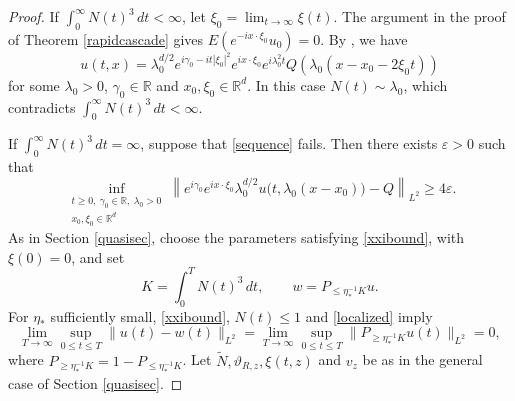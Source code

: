 \documentclass[reqno,11pt]{amsart}
\newcommand{\eps}{{\varepsilon}}
\theoremstyle{plain}
\theoremstyle{definition}
\numberwithin{equation}{section}
\numberwithin{theorem}{section}
\def\geq{\geqslant}
\def\leq{\leqslant}
\def\R{\mathbb{R}}
\def\eps{\varepsilon}
\begin{document}
\begin{proof}
If $\int_0^\infty N(t)^3\,dt<\infty$, let
$\xi_0=\lim_{t\to\infty}\xi(t)$. The argument in the proof of
Theorem \ref{rapidcascade} gives $E(e^{-ix\cdot\xi_0}u_0)=0$.
By \cite[Proposition 3.2]{MiaoXuZhaoblowup}, we have
\[
 u(t,x)=\lambda_0^{d/2}e^{i\gamma_0-it|\xi_0|^2}e^{ix\cdot\xi_0}
       e^{i\lambda_0^2t}Q(\lambda_0(x-x_0-2\xi_0t))
\]
for some $\lambda_0>0$, $\gamma_0\in\R$ and $x_0,\xi_0\in\R^d$.
In this case $N(t)\sim\lambda_0$, which contradicts
$\int_0^\infty N(t)^3\,dt<\infty$.

If $\int_0^\infty N(t)^3\,dt=\infty$, suppose that \eqref{sequence}
fails. Then there exists $\eps>0$ such that
\[
 \inf_{\substack{t\geq0,\ \gamma_0\in\R,\ \lambda_0>0\\
                  x_0,\xi_0\in\R^d}}
 \left\|e^{i\gamma_0}e^{ix\cdot\xi_0}\lambda_0^{d/2}
 u\bigl(t,\lambda_0(x-x_0)\bigr)-Q\right\|_{L^2}\geq4\eps.
\]
As in Section \ref{quasisec}, choose the parameters satisfying
\eqref{xxibound}, with $\xi(0)=0$, and set
\[
 K=\int_0^TN(t)^3\,dt,\qquad w=P_{\leq\eta_{\ast}^{-1}K}u.
\]
For $\eta_{\ast}$ sufficiently small, \eqref{xxibound}, $N(t)\leq1$
and \eqref{localized} imply
\begin{equation}\label{appd5}
 \lim_{T\to\infty}\sup_{0\leq t\leq T}
 \|u(t)-w(t)\|_{L^2}
 =\lim_{T\to\infty}\sup_{0\leq t\leq T}
 \|P_{\geq\eta_{\ast}^{-1}K}u(t)\|_{L^2}=0,
\end{equation}
where $P_{\geq\eta_{\ast}^{-1}K}=1-P_{\leq\eta_{\ast}^{-1}K}$.
Let $\tilde N,\vartheta_{R,z},\xi(t,z)$ and $v_z$ be as in the general
case of Section \ref{quasisec}.


\end{proof}
\end{document}

